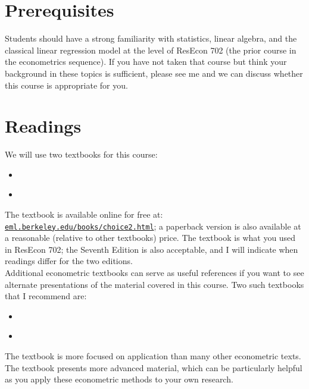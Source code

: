 \documentclass[11pt,letterpaper]{article}
\begin{document}
\section*{Prerequisites}

Students should have a strong familiarity with statistics, linear algebra, and the classical linear regression model at the level of ResEcon 702 (the prior course in the econometrics sequence). If you have not taken that course but think your background in these topics is sufficient, please see me and we can discuss whether this course is appropriate for you.

\section*{Readings}

We will use two textbooks for this course:
\begin{itemize}
	\item[] \begin{refsection} \nocite{train_discrete_2009} \printbibliography[heading=none] \end{refsection}
	\item[] \begin{refsection} \nocite{greene_econometric_2018} \printbibliography[heading=none] \end{refsection}
\end{itemize}
The \citeauthor{train_discrete_2009} textbook is available online for free at: \href{https://eml.berkeley.edu/books/choice2.html}{\texttt{eml.berkeley.edu/books/choice2.html}}; a paperback version is also available at a reasonable (relative to other textbooks) price. The \citeauthor{greene_econometric_2018} textbook is what you used in ResEcon 702; the Seventh Edition is also acceptable, and I will indicate when readings differ for the two editions. \\

\noindent Additional econometric textbooks can serve as useful references if you want to see alternate presentations of the material covered in this course. Two such textbooks that I recommend are:
\begin{itemize}
	\item[] \begin{refsection} \nocite{cameron_microeconometrics:_2005} \printbibliography[heading=none] \end{refsection}
	\item[] \begin{refsection} \nocite{wooldridge_economteric_2010} \printbibliography[heading=none] \end{refsection}
\end{itemize}
The \citeauthor{cameron_microeconometrics:_2005} textbook is more focused on application than many other econometric texts. The \citeauthor{wooldridge_economteric_2010} textbook presents more advanced material, which can be particularly helpful as you apply these econometric methods to your own research. \\
\end{document}
